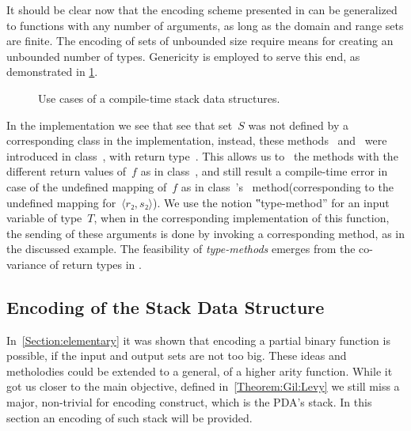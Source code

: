 It should be clear now that the encoding scheme presented in  can be generalized to functions
  with any number of arguments, as long as the domain and range sets are finite. 
The encoding of sets of unbounded size require means for creating an unbounded 
  number of types. 
Genericity is employed to serve this end, as demonstrated in \cref{Figure:stack-use-cases}.

\begin{figure}[htb]
  \caption{\label{Figure:stack-use-cases}%
    Use cases of a compile-time stack data structures.
  }
\end{figure}

In the implementation we see that see that set~$S$ was not defined by a corresponding class in
  the implementation, instead, these methods~ and~ were introduced in
  class~, with return type~.
This allows us to~ the methods with the different return values of~$f$ as
 in class~, and still result a compile-time error in case of the undefined mapping of~$f$
 as in class~'s~ method(corresponding to the undefined mapping for~$⟨r₂, s₂⟩$).
We use the notion ‟type-method” for an input variable of type~$T$, when in the
  corresponding implementation of this function, the sending of these arguments is done
  by invoking a corresponding method, as in the discussed example.
The feasibility of \emph{type-methods} emerges from the co-variance of return types in
  \Java.


\subsection{Encoding of the Stack Data Structure}
In~\cref{Section:elementary} it was shown that encoding a partial binary function is possible, if
  the input and output sets are not too big. 
  These ideas and metholodies could be extended to a general, of a higher arity function.
While it got us closer to the main objective, defined in~\cref{Theorem:Gil:Levy} we still miss a major, 
  non-trivial for encoding construct, which is the PDA's stack.
In this section an encoding of such stack will be provided.

